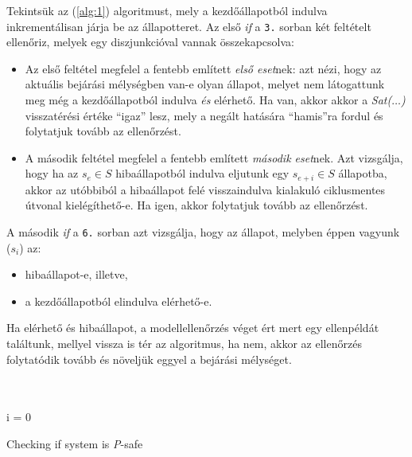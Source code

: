 Tekintsük az (\ref{alg:1}) algoritmust, mely a kezdőállapotból indulva inkrementálisan járja be az állapotteret. Az első \emph{if} a \verb+3.+ sorban két feltételt ellenőriz, melyek egy diszjunkcióval vannak összekapcsolva:
\begin{itemize}
	\item Az első feltétel megfelel a fentebb említett \emph{első eset}nek: azt nézi, hogy az aktuális bejárási mélységben van-e olyan állapot, melyet nem látogattunk meg még a kezdőállapotból indulva \emph{és} elérhető. Ha van, akkor akkor a \emph{Sat($\ldots$)} visszatérési értéke ``igaz'' lesz, mely a negált hatására ``hamis''ra fordul és folytatjuk tovább az ellenőrzést.
	
	\item A második feltétel megfelel a fentebb említett \emph{második eset}nek. Azt vizsgálja, hogy ha az $s_e \in S$ hibaállapotból indulva eljutunk egy $s_{e+i} \in S$ állapotba, akkor az utóbbiból a hibaállapot felé visszaindulva kialakuló ciklusmentes útvonal kielégíthető-e. Ha igen, akkor folytatjuk tovább az ellenőrzést.
\end{itemize}
A második \emph{if} a \verb+6.+ sorban azt vizsgálja, hogy az állapot, melyben éppen vagyunk ($s_i$) az:
\begin{itemize}
	\item hibaállapot-e, illetve,
	\item a kezdőállapotból elindulva elérhető-e.
\end{itemize}
Ha elérhető és hibaállapot, a modellellenőrzés véget ért mert egy ellenpéldát találtunk, mellyel vissza is tér az algoritmus, ha nem, akkor az ellenőrzés folytatódik tovább és növeljük eggyel a bejárási mélységet.
\ \\
\ \\
\ \\
\begin{algorithm}[H]
\label{alg:1}

\SetAlgoLined
i = 0 \\
\caption{Checking if system is \emph{P}-safe}
\end{algorithm}

